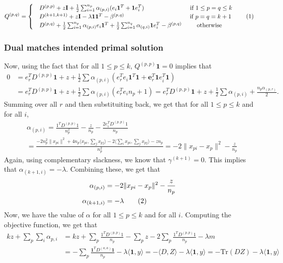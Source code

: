\documentclass[12pt]{article}
\newcommand{\mb}{\mathbf}
\newcommand{\tr}{\text{Tr}}
\newcommand\numberthis{\addtocounter{equation}{1}\tag{\theequation}}
\begin{document}
\begin{alignat*}{1}
  Q^{(p, q)} = 
  \begin{cases}
    &D^{(p,p)} + z \mb I + \frac{1}{2}\sum_{i=1}^{n_p} \alpha_{(p,i)} (e_{i}\mb 1^T + \mb 1e_{i}^T) \hspace{1in}\text{ if } 1 \le p = q \le k\\
    &D^{(k+1,k+1)} + z\mb I - \lambda \mb 1 \mb 1^T - \beta^{(p,q)} \hspace{1.45in}\text{ if } p = q = k+1\\
    &D^{(p,q)} + \frac{1}{2}\sum_{i=1}^{n_p} \alpha_{(p,i)} e_{i}\mb 1^T + \frac{1}{2}\sum_{i=1}^{n_q}\alpha_{(q,i)}\mb 1e_{i}^T - \beta^{(p,q)} \hspace{0.3in}\text{ otherwise }
  \end{cases}
  \label{a-eqn:resularisedQ}\numberthis
\end{alignat*} 

\subsubsection*{Dual matches intended primal solution}
Now, using the fact that for all $1\le p \le k$, $Q^{(p, p)}\mb 1 = 0$ implies that
\begin{align*}
  0 &= e_r^TD^{(p,p)}\mb1 + z + \frac{1}{2}\sum\alpha_{(p,i)} (e_r^Te_{i}\mb 1^T\mb1 + \mb e_r^T\mb1e_{i}^T\mb1)\\
  & = e_r^TD^{(p,p)}\mb1 + z + \frac{1}{2}\sum\alpha_{(p,i)} (e_r^Te_{i}n_p + 1) = e_r^TD^{(p,p)}\mb1 + z + \frac{1}{2}\sum\alpha_{(p,i)} +\frac{n_p\alpha_{(p,r)}}{2}.
\end{align*}
Summing over all $r$ and then substituiting back, we get that for all $1\le p \le k$ and for all $i$,  
\begin{align*}
  &\alpha_{(p, i)} = \frac{1^TD^{(p,p)}1}{n_p^2}-\frac{z}{n_p} -\frac{2e_i^TD^{(p,p)}1}{n_p} \\
  &= \frac{-2n_p^2 \|x_{pi}\|^2 + 4n_p \langle x_{pi}, \sum_jx_{pj}\rangle - 2\langle \sum_i x_{pi}, \sum_j x_{pj}\rangle -zn_p}{n_p^2} = -2\|x_{pi} - x_p\|^2-\frac{z}{n_p}
\end{align*}
Again, using complementary slackness, we know that $\gamma^{(k+1)} = 0$. This implies that $\alpha_{(k+1, i)} = -\lambda$. Combining these, we get that
\begin{align*}
  \alpha_{(p, i)} &= -2\|x_{pi} - x_p\|^2-\frac{z}{n_p} \\
  \alpha_{(k+1, i)} &= -\lambda \numberthis\label{a-eqn:regularisedAlpha} 
\end{align*}
Now, we have the value of $\alpha$ for all $1\le p \le k$ and for all $i$. Computing the objective function, we get that 
\begin{align*}
  kz + \sum_p\sum_i \alpha_{p,i} &= kz + \sum_{p}\frac{1^TD^{(p, p)}1}{n_p} - \sum_p z -2\sum_p \frac{1^TD^{(p,p)}1}{n_p} - \lambda m \\
  &= -\sum_p \frac{\mb1^TD^{(a,a)}\mb1}{n_p} - \lambda \langle \mb 1, y\rangle = -\langle D, Z \rangle - \lambda \langle \mb 1, y\rangle = - \tr(DZ) - \lambda \langle \mb 1, y\rangle
\end{align*}
\end{document}
